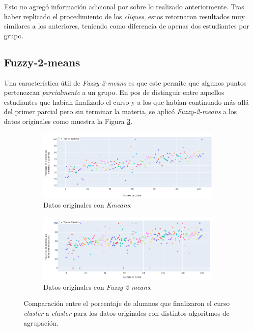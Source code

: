\documentclass[11pt,a4paper,twoside,openany]{tesis}
\begin{document}
Esto no agregó información adicional por sobre lo realizado anteriormente. Tras haber replicado el procedimiento de los \emph{cliques}, estos retornaron resultados muy similares a los anteriores, teniendo como diferencia de apenas dos estudiantes por grupo. 



\subsection{Fuzzy-2-means}

Una característica útil de \emph{Fuzzy-2-means} es que este permite que algunos puntos pertenezcan \emph{parcialmente} a un grupo. En pos de distinguir entre aquellos estudiantes que habían finalizado el curso y a los que habían continuado más allá del primer parcial pero sin terminar la materia, se aplicó \emph{Fuzzy-2-means} a los datos originales como muestra la Figura \ref{fuzzy}.

\begin{figure}[H]
    \centering
    \begin{subfigure}{0.45\textwidth}
        \includegraphics[width=\linewidth]{imagenes/porcentaje - original.png}
        \caption{Datos originales con \emph{Kmeans}.}
        \label{fig:figura5}
    \end{subfigure}
    \hfill
    \begin{subfigure}{0.45\textwidth}
        \includegraphics[width=\linewidth]{imagenes/porcentaje - fuzzy.png}
        \caption{Datos originales con \emph{Fuzzy-2-means}.}
        \label{fig:figura6}
    \end{subfigure}
    \caption{Comparación entre el porcentaje de alumnos que finalizaron el curso \emph{cluster} a \emph{cluster} para los datos originales con distintos algoritmos de agrupación.}
    \label{fuzzy}
\end{figure}
\end{document}
